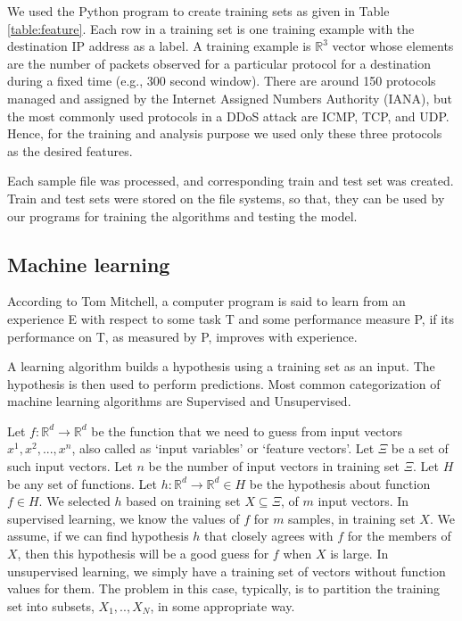 \documentclass[12pt,oneside,a4paper]{article}
\begin{document}
We used the Python program to create training sets as given in Table \ref{table:feature}. Each row in a training set is one training example with the destination IP address as a label. A training example is $\mathbb{R}^3$ vector whose elements are the number of packets observed for a particular protocol for a destination during a fixed time (e.g., 300 second window). There are around 150 protocols managed and assigned by the Internet Assigned Numbers Authority (IANA), but the most commonly used protocols in a DDoS attack are ICMP, TCP, and UDP. Hence, for the training and analysis purpose we used only these three protocols as the desired features.

Each sample file was processed, and corresponding train and test set was created. Train and test sets were stored on the file systems, so that, they can be used by our programs for training the algorithms and testing the model.

\subsection{Machine learning}

According to Tom Mitchell\cite{machine-learning-def}, a computer program is said to learn from an experience E with respect to some task T and some performance measure P, if its performance on T, as measured by P, improves with experience.

A learning algorithm builds a hypothesis using a training set as an input. The hypothesis is then used to perform predictions. Most common categorization of machine learning algorithms are Supervised and Unsupervised.

Let $f: \mathbb{R}^d \rightarrow \mathbb{R}^d$ be the function that we need to guess from input vectors $x^{1}, x^{2}, ..., x^{n}$, also called as `input variables' or `feature vectors'. Let $\Xi$ be a set of such input vectors. Let $n$ be the number of input vectors in training set $\Xi$. Let $H$ be any set of functions. Let $h:\mathbb{R}^d \rightarrow \mathbb{R}^d \in H$ be the hypothesis about function $f \in H$. We selected $h$ based on training set $X \subseteq \Xi$, of $m$ input vectors. In supervised learning, we know the values of $f$ for $m$ samples, in training set $X$. We assume, if we can find hypothesis $h$ that closely agrees with $f$ for the members of $X$, then this hypothesis will be a good guess for $f$ when $X$ is large. In unsupervised learning, we simply have a training set of vectors without function values for them. The problem in this case, typically, is to partition the training set into subsets, $X_1,.. ,X_{N}$, in some appropriate way.\cite{machine-learning}
\end{document}
